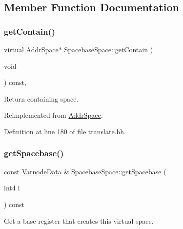 \subsection{Member Function Documentation}
\mbox{\label{class_spacebase_space_a4d673d57ee17e7b0d99b7152bf1c57ec}} 
\subsubsection{\texorpdfstring{getContain()}{getContain()}}
{\footnotesize\ttfamily virtual \mbox{\hyperlink{class_addr_space}{Addr\+Space}}$\ast$ Spacebase\+Space\+::get\+Contain (\begin{DoxyParamCaption}\item[{void}]{ }\end{DoxyParamCaption}) const\hspace{0.3cm}{\ttfamily [inline]}, {\ttfamily [virtual]}}



Return containing space. 



Reimplemented from \mbox{\hyperlink{class_addr_space_a616f457a28ab5779167183f47a5707b8}{Addr\+Space}}.



Definition at line 180 of file translate.\+hh.

\mbox{\label{class_spacebase_space_af8f5c5b9da9bd74ef022bd0c5c18c2ea}} 
\subsubsection{\texorpdfstring{getSpacebase()}{getSpacebase()}}
{\footnotesize\ttfamily const \mbox{\hyperlink{struct_varnode_data}{Varnode\+Data}} \& Spacebase\+Space\+::get\+Spacebase (\begin{DoxyParamCaption}\item[{int4}]{i }\end{DoxyParamCaption}) const\hspace{0.3cm}{\ttfamily [virtual]}}



Get a base register that creates this virtual space. 

